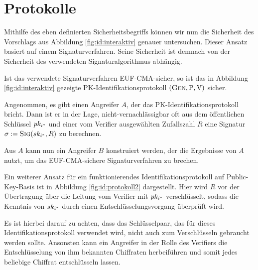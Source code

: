 \section{Protokolle}\label{sec:id:protokolle}
Mithilfe des eben definierten Sicherheitsbegriffs können wir nun die
Sicherheit des Vorschlags aus Abbildung \ref{fig:id:interaktiv} genauer untersuchen.
Dieser Ansatz basiert auf einem Signaturverfahren. Seine
Sicherheit ist demnach von der Sicherheit des verwendeten
Signaturalgorithmus abhängig.

\begin{theorem} Ist das verwendete Signaturverfahren EUF-CMA-sicher, so
ist das in Abbildung \ref{fig:id:interaktiv} gezeigte
PK-Identifikationsprotokoll $(\textsc{Gen}, \mathrm{P}, \mathrm{V})$
\indexPKIdentificationProtocol sicher.
\end{theorem}
\begin{beweisidee} Angenommen, es gibt einen Angreifer $A$, der das
PK-Identifikationsprotokoll bricht. Dann ist er in der Lage,
nicht-vernachlässigbar oft aus dem öffentlichen Schlüssel $pk_{i^*}$
und einer vom Verifier ausgewählten Zufallszahl $R$ eine Signatur
$\sigma := \textsc{Sig}(sk_{i^*}, R)$ zu berechnen.

Aus $A$ kann nun ein Angreifer $B$ konstruiert werden, der die
Ergebnisse von $A$ nutzt, um das EUF-CMA-sichere Signaturverfahren zu
brechen.~\\
\end{beweisidee}

Ein weiterer Ansatz für ein funktionierendes Identifikationsprotokoll
auf Public-Key-Basis ist in Abbildung \ref{fig:id:protokoll2}
dargestellt.  Hier wird $R$ vor der Übertragung über die Leitung vom
Verifier mit $pk_{i^*}$ verschlüsselt, sodass die Kenntnis von
$sk_{i^*}$ durch einen Entschlüsselungsvorgang überprüft wird.

Es ist hierbei darauf zu achten, dass das Schlüsselpaar, das für dieses
Identifikationsprotokoll verwendet wird, nicht auch zum Verschlüsseln
gebraucht werden sollte. Ansonsten kann ein Angreifer in der Rolle des
Verifiers die Entschlüsselung von ihm bekannten Chiffraten herbeiführen
und somit jedes beliebige Chiffrat entschlüsseln lassen.

